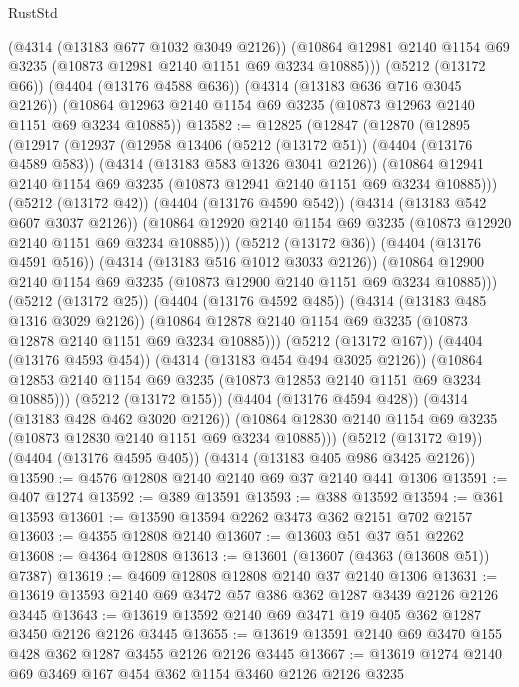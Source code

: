 \begin{lexlean}{RustStd}
\begin{coremodule}
{\begin{coremodule}
{{{{{{{{{{{{{{{{      (@4314 (@13183 @677 @1032 @3049 @2126))
      (@10864 @12981 @2140 @1154 @69 @3235 (@10873 @12981 @2140 @1151 @69 @3234 @10885)))
    (@5212 (@13172 @66))
    (@4404 (@13176 @4588 @636))
    (@4314 (@13183 @636 @716 @3045 @2126))
    (@10864 @12963 @2140 @1154 @69 @3235 (@10873 @12963 @2140 @1151 @69 @3234 @10885))
@13582 := @12825
    (@12847
      (@12870
        (@12895
          (@12917
            (@12937
              (@12958
                @13406
                (@5212 (@13172 @51))
                (@4404 (@13176 @4589 @583))
                (@4314 (@13183 @583 @1326 @3041 @2126))
                (@10864 @12941 @2140 @1154 @69 @3235 (@10873 @12941 @2140 @1151 @69 @3234 @10885)))
              (@5212 (@13172 @42))
              (@4404 (@13176 @4590 @542))
              (@4314 (@13183 @542 @607 @3037 @2126))
              (@10864 @12920 @2140 @1154 @69 @3235 (@10873 @12920 @2140 @1151 @69 @3234 @10885)))
            (@5212 (@13172 @36))
            (@4404 (@13176 @4591 @516))
            (@4314 (@13183 @516 @1012 @3033 @2126))
            (@10864 @12900 @2140 @1154 @69 @3235 (@10873 @12900 @2140 @1151 @69 @3234 @10885)))
          (@5212 (@13172 @25))
          (@4404 (@13176 @4592 @485))
          (@4314 (@13183 @485 @1316 @3029 @2126))
          (@10864 @12878 @2140 @1154 @69 @3235 (@10873 @12878 @2140 @1151 @69 @3234 @10885)))
        (@5212 (@13172 @167))
        (@4404 (@13176 @4593 @454))
        (@4314 (@13183 @454 @494 @3025 @2126))
        (@10864 @12853 @2140 @1154 @69 @3235 (@10873 @12853 @2140 @1151 @69 @3234 @10885)))
      (@5212 (@13172 @155))
      (@4404 (@13176 @4594 @428))
      (@4314 (@13183 @428 @462 @3020 @2126))
      (@10864 @12830 @2140 @1154 @69 @3235 (@10873 @12830 @2140 @1151 @69 @3234 @10885)))
    (@5212 (@13172 @19))
    (@4404 (@13176 @4595 @405))
    (@4314 (@13183 @405 @986 @3425 @2126))
@13590 := @4576 @12808 @2140 @2140 @69 @37 @2140 @441 @1306
@13591 := @407 @1274
@13592 := @389 @13591
@13593 := @388 @13592
@13594 := @361 @13593
@13601 := @13590 @13594 @2262 @3473 @362 @2151 @702 @2157
@13603 := @4355 @12808 @2140
@13607 := @13603 @51 @37 @51 @2262
@13608 := @4364 @12808
@13613 := @13601 (@13607 (@4363 (@13608 @51)) @7387)
@13619 := @4609 @12808 @12808 @2140 @37 @2140 @1306
@13631 := @13619 @13593 @2140 @69 @3472 @57 @386 @362 @1287 @3439 @2126 @2126 @3445
@13643 := @13619 @13592 @2140 @69 @3471 @19 @405 @362 @1287 @3450 @2126 @2126 @3445
@13655 := @13619 @13591 @2140 @69 @3470 @155 @428 @362 @1287 @3455 @2126 @2126 @3445
@13667 := @13619 @1274 @2140 @69 @3469 @167 @454 @362 @1154 @3460 @2126 @2126 @3235
}}}}}}}}}}}}}}}}
\end{coremodule}}
\end{coremodule}
\end{lexlean}
